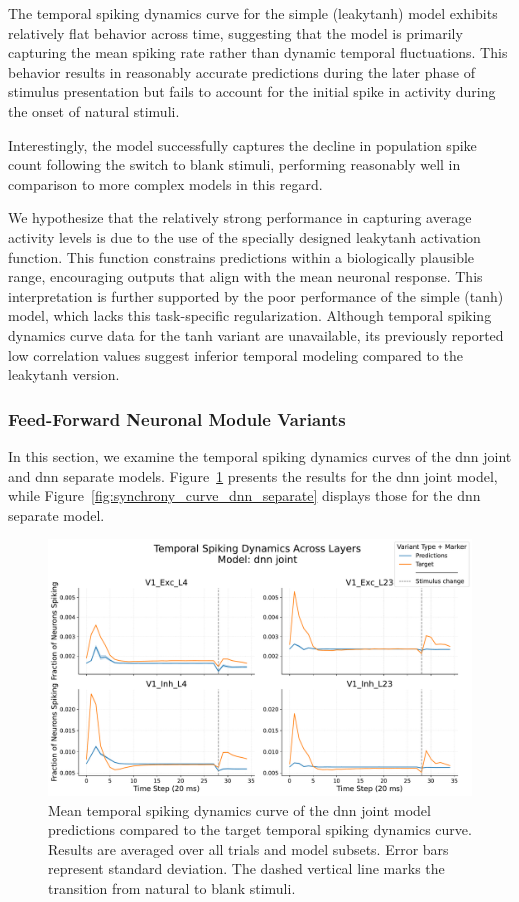 The temporal spiking dynamics curve for the simple (leakytanh) model exhibits relatively flat behavior across time, suggesting that the model is primarily capturing the mean spiking rate rather than dynamic temporal fluctuations. This behavior results in reasonably accurate predictions during the later phase of stimulus presentation but fails to account for the initial spike in activity during the onset of natural stimuli.

Interestingly, the model successfully captures the decline in population spike count following the switch to blank stimuli, performing reasonably well in comparison to more complex models in this regard.

We hypothesize that the relatively strong performance in capturing average activity levels is due to the use of the specially designed leakytanh activation function. This function constrains predictions within a biologically plausible range, encouraging outputs that align with the mean neuronal response. This interpretation is further supported by the poor performance of the simple (tanh) model, which lacks this task-specific regularization. Although temporal spiking dynamics curve data for the tanh variant are unavailable, its previously reported low correlation values suggest inferior temporal modeling compared to the leakytanh version.


\subsubsection{Feed-Forward Neuronal Module Variants}
\label{{subsubsec:dnn_eval}}
In this section, we examine the temporal spiking dynamics curves of the dnn joint and dnn separate models. Figure~\ref{fig:synchrony_curve_dnn_joint} presents the results for the dnn joint model, while Figure~\ref{fig:synchrony_curve_dnn_separate} displays those for the dnn separate model.
\begin{figure}
    \centering
    \includegraphics[width=\linewidth]{img/plots/separate_model_synchrony_curve_dnn_joint_evaluation.pdf}
    \caption{Mean temporal spiking dynamics curve of the dnn joint model predictions compared to the target temporal spiking dynamics curve. Results are averaged over all trials and model subsets. Error bars represent standard deviation. The dashed vertical line marks the transition from natural to blank stimuli.}
    \label{fig:synchrony_curve_dnn_joint}
\end{figure}


